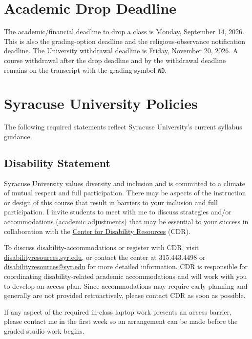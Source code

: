 \documentclass[11pt]{article}
\newcommand{\DropDeadline}{Monday, September 14, 2026}
\newcommand{\WithdrawalDeadline}{Friday, November 20, 2026}
\begin{document}
\section{Academic Drop Deadline}

The academic/financial deadline to drop a class is \DropDeadline{}. This is also the
grading-option deadline and the religious-observance notification deadline. The University
withdrawal deadline is \WithdrawalDeadline{}. A course withdrawal after the drop deadline and
by the withdrawal deadline remains on the transcript with the grading symbol \texttt{WD}.

\section{Syracuse University Policies}

The following required statements reflect Syracuse University's current syllabus guidance.

\subsection{Disability Statement}

Syracuse University values diversity and inclusion and is committed to a climate of mutual
respect and full participation. There may be aspects of the instruction or design of this
course that result in barriers to your inclusion and full participation. I invite students to
meet with me to discuss strategies and/or accommodations (academic adjustments) that may be
essential to your success in collaboration with the
\href{https://disabilityresources.syr.edu/}{Center for Disability Resources} (CDR).

To discuss disability-accommodations or register with CDR, visit
\href{https://disabilityresources.syr.edu/}{disabilityresources.syr.edu}, or contact the
center at 315.443.4498 or \href{mailto:disabilityresources@syr.edu}{disabilityresources@syr.edu}
for more detailed information. CDR is responsible for coordinating disability-related
academic accommodations and will work with you to develop an access plan. Since accommodations
may require early planning and generally are not provided retroactively, please contact CDR as
soon as possible.

If any aspect of the required in-class laptop work presents an access barrier, please contact
me in the first week so an arrangement can be made before the graded studio work begins.
\end{document}
